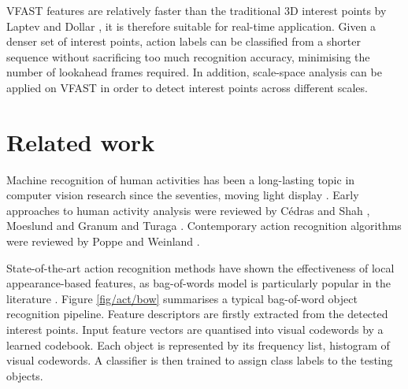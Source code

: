 VFAST features are relatively faster than the traditional 3D interest points by Laptev \cite{Laptev2005} and Dollar \etal \cite{Dollar2005}, it is therefore suitable for real-time application. 
Given a denser set of interest points, action labels can be classified from a shorter sequence without sacrificing too much recognition accuracy, minimising the number of lookahead frames required. 
In addition, scale-space analysis can be applied on VFAST in order to detect interest points across different scales.



\section{Related work}
\label{sec/act/relatedwork}

Machine recognition of human activities has been a long-lasting topic in computer vision research since the seventies, \eg moving light display \cite{Johansson1973}. Early approaches to human activity analysis were reviewed by C\'edras and Shah \cite{Cedras1995}, Moeslund and Granum \cite{Moeslund2001} and Turaga \etal \cite{Turaga2008}. Contemporary action recognition algorithms were reviewed by Poppe \cite{Poppe2010} and Weinland \etal \cite{Weinland2011}.   

State-of-the-art action recognition methods have shown the effectiveness of local appearance-based features, as bag-of-words model is particularly popular in the literature \cite{Schuldt2004, Dollar2005, Riemenschneider2009, Niebles2008, Wong2007}.
Figure \ref{fig/act/bow} summarises a typical bag-of-word object recognition pipeline. Feature descriptors are firstly extracted from the detected interest points. Input feature vectors are quantised into visual codewords by a learned codebook. Each object is represented by its frequency list, \ie histogram of visual codewords. A classifier is then trained to assign class labels to the testing objects.

